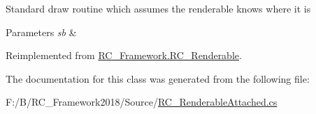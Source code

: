 Standard draw routine which assumes the renderable knows where it is 


\begin{DoxyParams}{Parameters}
{\em sb} & \\
\hline
\end{DoxyParams}


Reimplemented from \mbox{\hyperlink{class_r_c___framework_1_1_r_c___renderable_acc26db34e382a25a989c4c0dd0354b23}{R\+C\+\_\+\+Framework.\+R\+C\+\_\+\+Renderable}}.



The documentation for this class was generated from the following file\+:\begin{DoxyCompactItemize}
\item 
F\+:/\+B/\+R\+C\+\_\+\+Framework2018/\+Source/\mbox{\hyperlink{_r_c___renderable_attached_8cs}{R\+C\+\_\+\+Renderable\+Attached.\+cs}}\end{DoxyCompactItemize}

